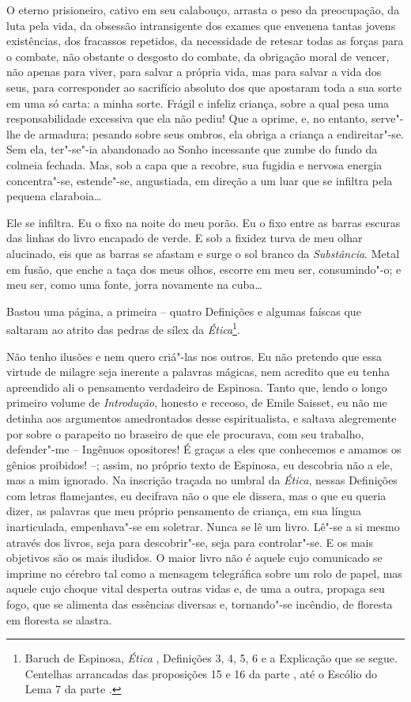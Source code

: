 O eterno prisioneiro, cativo em seu
calabouço, arrasta o peso da preocupação, da luta pela vida, da obsessão
intransigente dos exames que envenena tantas jovens existências, dos
fracassos repetidos, da necessidade de retesar todas as forças para o
combate, não obstante o desgosto do combate, da obrigação moral de
vencer, não apenas para viver, para salvar a própria vida, mas para
salvar a vida dos seus, para corresponder ao sacrifício absoluto dos que
apostaram toda a sua sorte em uma só carta: a minha sorte. Frágil e
infeliz criança, sobre a qual pesa uma responsabilidade excessiva que
ela não pediu! Que a oprime, e, no entanto, serve"-lhe de armadura;
pesando sobre seus ombros, ela obriga a criança a endireitar"-se. Sem
ela, ter"-se"-ia abandonado ao Sonho incessante que zumbe do fundo da
colmeia fechada. Mas, sob a capa que a recobre, sua fugidia e nervosa
energia concentra"-se, estende"-se, angustiada, em direção a um luar que
se infiltra pela pequena claraboia\ldots{}

\quebra

Ele se infiltra. Eu o fixo na noite do meu porão. Eu o fixo entre as
barras escuras das linhas do livro encapado de verde. E sob a fixidez
turva de
meu olhar alucinado, eis que as barras se afastam e surge o sol
branco da \emph{Substância}. Metal em fusão, que enche a taça dos meus
olhos, escorre em meu ser, consumindo"-o; e meu ser, como uma fonte,
jorra novamente na cuba\ldots{}

Bastou uma página, a primeira -- quatro Definições e algumas faíscas que
saltaram ao atrito das pedras de sílex da \emph{Ética}\footnote{Baruch
  de Espinosa, \emph{Ética} , Definições 3, 4, 5, 6 e a Explicação que
  se segue. Centelhas arrancadas das proposições 15 e 16 da parte , até
  o Escólio do Lema 7 da parte .}.

Não tenho ilusões e nem quero criá"-las nos outros. Eu não pretendo que
essa virtude de milagre seja inerente a palavras mágicas, nem acredito
que eu tenha apreendido ali o pensamento verdadeiro de Espinosa. Tanto
que, lendo o longo primeiro volume de \emph{Introdução}, honesto e
receoso, de Emile Saisset, eu não me detinha aos argumentos amedrontados
desse espiritualista, e saltava alegremente por sobre o parapeito no
braseiro de que ele procurava, com seu trabalho, defender"-me -- Ingênuos
opositores! É graças a eles que conhecemos e amamos os gênios proibidos!
--; assim, no próprio texto de Espinosa, eu descobria não a ele, mas a
mim ignorado. Na inscrição traçada no umbral da \emph{Ética}, nessas
Definições com letras flamejantes, eu decifrava não o que ele dissera,
mas o que eu queria dizer, as palavras que meu próprio pensamento de
criança, em sua língua inarticulada, empenhava"-se em soletrar. Nunca se
lê um livro. Lê"-se a si mesmo através dos livros, seja para
descobrir"-se, seja para controlar"-se. E os mais objetivos são os mais
iludidos. O maior livro não é aquele cujo comunicado se imprime no
cérebro tal como a mensagem telegráfica sobre um rolo de papel, mas
aquele cujo choque vital desperta outras vidas e, de uma a outra,
propaga seu fogo, que se alimenta das essências diversas e, tornando"-se
incêndio, de floresta em floresta se alastra.

